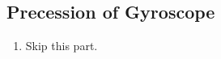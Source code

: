 \documentclass{article}
\begin{document}
\begin{enumerate}





\end{enumerate}

\subsection*{Precession of Gyroscope}
\begin{enumerate}
\item Skip this part. 
\end{enumerate}
\end{document}

